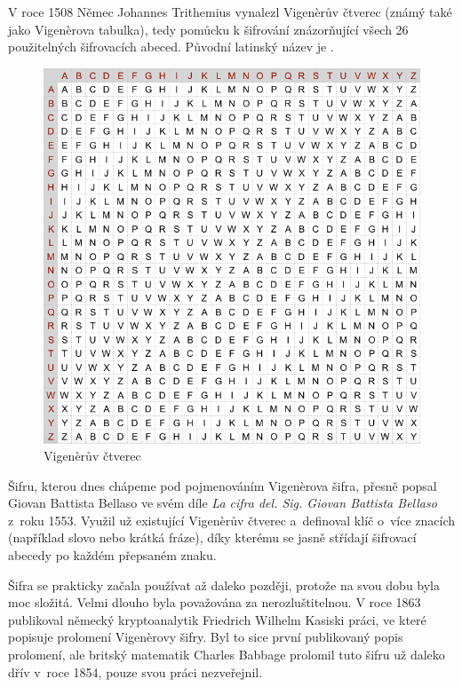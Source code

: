 \documentclass[glossaries, index]{kidiplom}
\begin{document}
V roce 1508 Němec Johannes Trithemius vynalezl Vigenèrův čtverec (známý také jako Vigenèrova tabulka), tedy pomůcku k šifrování znázorňující všech 26 použitelných šifrovacích abeced. Původní latinský název je .

\begin{figure}[htbp]
\centering
\includegraphics[scale=0.4]{graphics/vigenere_square.png}
\caption{Vigenèrův čtverec}
\label{vigenere-square}
\end{figure}

Šifru, kterou dnes chápeme pod pojmenováním Vigenèrova šifra, přesně popsal Giovan Battista Bellaso ve svém díle \textit{La cifra del. Sig. Giovan Battista Bellaso} z~roku 1553. Využil už existující Vigenèrův čtverec a~definoval klíč o~více znacích (například slovo nebo krátká fráze), díky kterému se jasně střídají šifrovací abecedy po každém přepsaném znaku.

Šifra se prakticky začala používat až daleko později, protože na svou dobu byla moc složitá. Velmi dlouho byla považována za nerozluštitelnou. V roce 1863 publikoval německý kryptoanalytik Friedrich Wilhelm Kasiski práci, ve které popisuje prolomení  Vigenèrovy šifry. Byl to sice první publikovaný popis prolomení, ale britský matematik Charles Babbage prolomil tuto šifru už daleko dřív v~roce 1854, pouze svou práci nezveřejnil.
\end{document}
